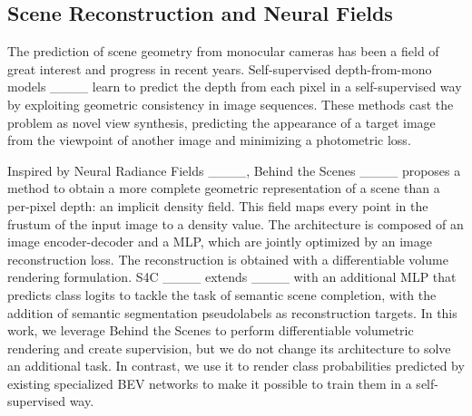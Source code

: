 \subsection{Scene Reconstruction and Neural Fields}
The prediction of scene geometry from monocular cameras has been a field of great interest and progress in recent years. Self-supervised depth-from-mono models ____ learn to predict the depth from each pixel in a self-supervised way by exploiting geometric consistency in image sequences. These methods cast the problem as novel view synthesis, predicting the appearance of a target image from the viewpoint of another image and minimizing a photometric loss.

Inspired by Neural Radiance Fields ____, Behind the Scenes ____ proposes a method to obtain a more complete geometric representation of a scene than a per-pixel depth: an implicit density field. This field maps every point in the frustum of the input image to a density value.
The architecture is composed of an image encoder-decoder and a MLP, which are jointly optimized by an image reconstruction loss. The reconstruction is obtained with a differentiable volume rendering formulation. S4C ____ extends ____ with an additional MLP that predicts class logits to tackle the task of semantic scene completion, with the addition of semantic segmentation pseudolabels as reconstruction targets. In this work, we leverage Behind the Scenes to perform differentiable volumetric rendering and create supervision, but we do not change its architecture to solve an additional task. In contrast, we use it to render class probabilities predicted by existing specialized BEV networks to make it possible to train them in a self-supervised way.
